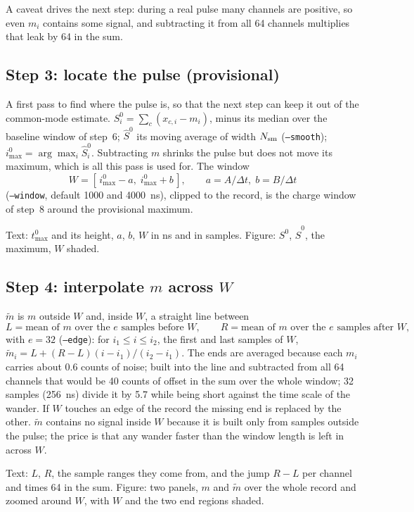 \documentclass[11pt]{article}
\newcommand{\code}[1]{\texttt{#1}}
\begin{document}
A caveat drives the next step: during a real pulse many channels are
positive, so even $m_i$ contains some signal, and subtracting it from all
64 channels multiplies that leak by 64 in the sum.

\subsection{Step 3: locate the pulse (provisional)}

A first pass to find where the pulse is, so that the next step can keep it
out of the common-mode estimate. $S^0_i = \sum_c (x_{c,i} - m_i)$, minus
its median over the baseline window of step~6; $\hat S^0$ its moving
average of width $N_{\rm sm}$ (\code{--smooth}); $i^0_{\max} = \arg\max_i
\hat S^0_i$. Subtracting $m$ shrinks the pulse but does not move its
maximum, which is all this pass is used for. The window
\[
  W = [\,i^0_{\max} - a,\; i^0_{\max} + b\,], \qquad a = A/\Delta t,\; b = B/\Delta t
\]
(\code{--window}, default 1000 and 4000~ns), clipped to the record, is the
charge window of step~8 around the provisional maximum.

Text: $t^0_{\max}$ and its height, $a$, $b$, $W$ in ns and in samples.
Figure: $S^0$, $\hat S^0$, the maximum, $W$ shaded.

\subsection{Step 4: interpolate $m$ across $W$}

$\tilde m$ is $m$ outside $W$ and, inside $W$, a straight line between
\[
  L = \text{mean of } m \text{ over the } e \text{ samples before } W, \qquad
  R = \text{mean of } m \text{ over the } e \text{ samples after } W,
\]
with $e = 32$ (\code{--edge}): for $i_1 \le i \le i_2$, the first and
last samples of $W$, $\tilde m_i = L + (R - L)(i - i_1)/(i_2 - i_1)$. The
ends are averaged because each $m_i$ carries about 0.6 counts of noise;
built into the line and subtracted from all 64 channels that would be
40 counts of offset in the sum over the whole window; 32 samples (256~ns)
divide it by 5.7 while being short against the time scale of the wander.
If $W$ touches an edge of the record the missing end is replaced by the
other. $\tilde m$ contains no signal inside $W$ because it is built only
from samples outside the pulse; the price is that any wander faster than
the window length is left in across $W$.

Text: $L$, $R$, the sample ranges they come from, and the jump $R - L$ per
channel and times 64 in the sum. Figure: two panels, $m$ and $\tilde m$
over the whole record and zoomed around $W$, with $W$ and the two end
regions shaded.
\end{document}
